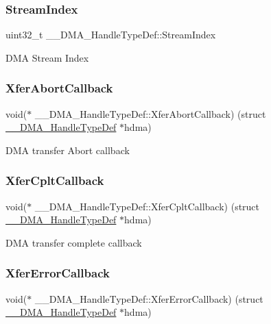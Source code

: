 \subsubsection{\texorpdfstring{StreamIndex}{StreamIndex}}
{\footnotesize\ttfamily uint32\+\_\+t \+\_\+\+\_\+\+D\+M\+A\+\_\+\+Handle\+Type\+Def\+::\+Stream\+Index}

D\+MA Stream Index \mbox{\label{struct_____d_m_a___handle_type_def_a5866f59e3a12760e559c4547ebf19d37}} 
\subsubsection{\texorpdfstring{XferAbortCallback}{XferAbortCallback}}
{\footnotesize\ttfamily void($\ast$  \+\_\+\+\_\+\+D\+M\+A\+\_\+\+Handle\+Type\+Def\+::\+Xfer\+Abort\+Callback) (struct \mbox{\hyperlink{struct_____d_m_a___handle_type_def}{\+\_\+\+\_\+\+D\+M\+A\+\_\+\+Handle\+Type\+Def}} $\ast$hdma)}

D\+MA transfer Abort callback \mbox{\label{struct_____d_m_a___handle_type_def_a4f323d8234b3f5f454a639e9df3cba23}} 
\subsubsection{\texorpdfstring{XferCpltCallback}{XferCpltCallback}}
{\footnotesize\ttfamily void($\ast$  \+\_\+\+\_\+\+D\+M\+A\+\_\+\+Handle\+Type\+Def\+::\+Xfer\+Cplt\+Callback) (struct \mbox{\hyperlink{struct_____d_m_a___handle_type_def}{\+\_\+\+\_\+\+D\+M\+A\+\_\+\+Handle\+Type\+Def}} $\ast$hdma)}

D\+MA transfer complete callback \mbox{\label{struct_____d_m_a___handle_type_def_a5905bba1de7dc9d803a50dfb44d0a9e8}} 
\subsubsection{\texorpdfstring{XferErrorCallback}{XferErrorCallback}}
{\footnotesize\ttfamily void($\ast$  \+\_\+\+\_\+\+D\+M\+A\+\_\+\+Handle\+Type\+Def\+::\+Xfer\+Error\+Callback) (struct \mbox{\hyperlink{struct_____d_m_a___handle_type_def}{\+\_\+\+\_\+\+D\+M\+A\+\_\+\+Handle\+Type\+Def}} $\ast$hdma)}

